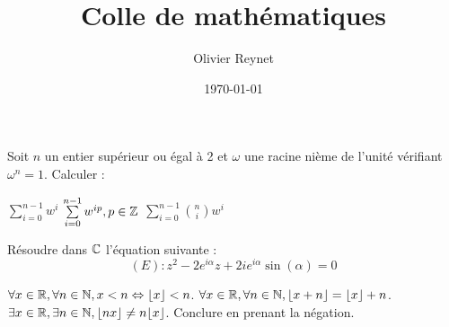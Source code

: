 \documentclass[french,12pt,a4paper]{article}
\author{Olivier Reynet}
\title{Colle de mathématiques}
\date{\today}
\begin{document}
\maketitle

\begin{exercise}[subtitle=Sommes et racines nièmes]
	Soit $n$ un entier supérieur ou égal à 2 et $\omega$ une racine nième de l'unité vérifiant $\omega^n=1$. Calculer :
	\begin{tasks}
		\task  $\sum\limits_{i=0}^{n-1} w^i$
		\task $\sum\limits_{i=0}^{n-1} w^{ip}, p\in \mathbb{Z}$
		\task $\sum\limits_{i=0}^{n-1} \binom{n}{i} w^{i}$
	\end{tasks}
\end{exercise}

\begin{exercise}[subtitle= Résolution d'équation dans $\CC$]
	Résoudre dans $\CC$ l'équation suivante : 
 $$(E) : z^2 - 2 e^{i\alpha} z + 2ie^{i\alpha}\sin(\alpha) = 0$$
\end{exercise}



\begin{exercise}[subtitle= Propriétés de la fonction partie entière]
	\begin{tasks}
		\task  \Mq  $\forall x \in \mathbb{R}, \forall n \in \mathbb{N}, x <n \Leftrightarrow \lfloor x \rfloor < n$.
		\task \Mq $\forall x \in \mathbb{R}, \forall n \in \mathbb{N}, \lfloor x + n \rfloor = \lfloor x \rfloor +n$.
		\task \Mq $\exists x \in \mathbb{R}, \exists n \in \mathbb{N}, \lfloor nx \rfloor \neq n \lfloor x \rfloor$. Conclure en prenant la négation. 
	\end{tasks}
\end{exercise}
\end{document}
